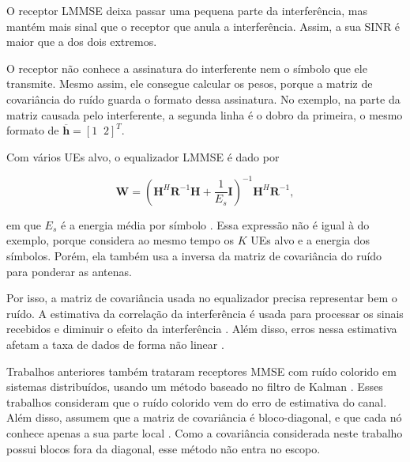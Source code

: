 O receptor LMMSE deixa passar uma pequena parte da interferência, mas mantém mais sinal que o receptor que anula a interferência. Assim, a sua SINR é maior que a dos dois extremos.



O receptor não conhece a assinatura do interferente nem o símbolo que ele transmite. Mesmo assim, ele consegue calcular os pesos, porque a matriz de covariância do ruído guarda o formato dessa assinatura. No exemplo, na parte da matriz causada pelo interferente, a segunda linha é o dobro da primeira, o mesmo formato de $\overline{\mathbf{h}}=[1\;\;2]^T$.

Com vários UEs alvo, o equalizador LMMSE é dado por

$$
\mathbf{W}=\left(\mathbf{H}^H\mathbf{R}^{-1}\mathbf{H}+\frac{1}{E_s}\mathbf{I}\right)^{-1}\mathbf{H}^H\mathbf{R}^{-1},
$$

em que $E_s$ é a energia média por símbolo \cite{zhao-lmmse}. Essa expressão não é igual à do exemplo, porque considera ao mesmo tempo os $K$ UEs alvo e a energia dos símbolos. Porém, ela também usa a inversa da matriz de covariância do ruído para ponderar as antenas.

Por isso, a matriz de covariância usada no equalizador precisa representar bem o ruído. A estimativa da correlação da interferência é usada para processar os sinais recebidos e diminuir o efeito da interferência \cite{tomasin-interference}. Além disso, erros nessa estimativa afetam a taxa de dados de forma não linear \cite{tomasin-interference}.



Trabalhos anteriores também trataram receptores MMSE com ruído colorido em sistemas distribuídos, usando um método baseado no filtro de Kalman \cite{zhao-lmmse}. Esses trabalhos consideram que o ruído colorido vem do erro de estimativa do canal. Além disso, assumem que a matriz de covariância é bloco-diagonal, e que cada nó conhece apenas a sua parte local \cite{zhao-lmmse}. Como a covariância considerada neste trabalho possui blocos fora da diagonal, esse método não entra no escopo.
